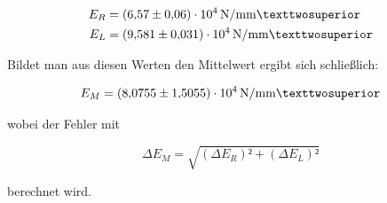\begin{align*}
E_R &= \SI{6.57+-0.06e4}{\newton\per\milli\meter²}\\
E_L &= \SI{9.581+-0.031e4}{\newton\per\milli\meter²}
\end{align*}

Bildet man aus diesen Werten den Mittelwert ergibt sich schließlich: 

\begin{equation*}
E_M = \SI{8.0755+-1.5055e4}{\newton\per\milli\meter²}
\end{equation*}

wobei der Fehler mit 

\begin{equation*}
\Delta E_M = \sqrt{(\Delta E_R)²+(\Delta E_L)²}
\end{equation*}

berechnet wird.